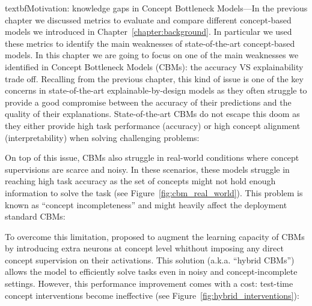 \documentclass[withindex,glossary]{cam-thesis}
\theoremstyle{plain}
\theoremstyle{definition}
\theoremstyle{remark}
\begin{document}
textbf{Motivation: knowledge gaps in Concept Bottleneck Models}---In the previous chapter we discussed metrics to evaluate and compare different concept-based models we introduced in Chapter~\ref{chapter:background}. In particular we used these metrics to identify the main weaknesses of state-of-the-art concept-based models. In this chapter we are going to focus on one of the main weaknesses we identified in Concept Bottleneck Models (CBMs): the accuracy VS explainability trade off. Recalling from the previous chapter, this kind of issue is one of the key concerns in state-of-the-art explainable-by-design models as they often struggle to provide a good compromise between the accuracy of their predictions and the quality of their explanations. State-of-the-art CBMs do not escape this doom as they either provide high task performance (accuracy) or high concept alignment (interpretability) when solving challenging problems:

On top of this issue, CBMs also struggle in real-world conditions where concept supervisions are scarce and noisy. In these scenarios, these models struggle in reaching high task accuracy as the set of concepts might not hold enough information to solve the task (see Figure~\ref{fig:cbm_real_world}). This problem is known as ``concept incompleteness'' and might heavily affect the deployment standard CBMs:

To overcome this limitation, \citet{mahinpei2021promises} proposed to augment the learning capacity of CBMs by introducing extra neurons at concept level whithout imposing any direct concept supervision on their activations. This solution (a.k.a. ``hybrid CBMs'') allows the model to efficiently solve tasks even in noisy and concept-incomplete settings. However, this performance improvement comes with a cost: test-time concept interventions become ineffective (see Figure~\ref{fig:hybrid_interventions}):
\end{document}

